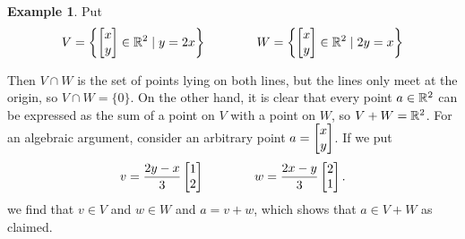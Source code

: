 \documentclass[reqno]{amsart}
\theoremstyle{definition}
\newtheorem{example}[theorem]{Example}
\begin{document}
\begin{example}\label{eg-sum-meet-i}
 Put
 \[ V = \left\{\left[\begin{matrix} x\\ y\end{matrix}\right]\in{\mathbb{R}}^2\;|\; y=2x\right\} \hspace{4em}
    W = \left\{\left[\begin{matrix} x\\ y\end{matrix}\right]\in{\mathbb{R}}^2\;|\; 2y=x\right\}
 \]

 \bigskip

 \begin{center}
 \end{center}
 Then $V\cap W$ is the set of points lying on both lines, but the
 lines only meet at the origin, so $V\cap W=\{0\}$.  On the other hand,
 it is clear that every point $a\in{\mathbb{R}}^2$ can be expressed as the sum
 of a point on $V$ with a point on $W$, so $V+W={\mathbb{R}}^2$.  For an
 algebraic argument, consider an arbitrary point $a=\left[\begin{matrix} x\\y \end{matrix}\right]$.
 If we put
 \[ v = \frac{2y-x}{3}\left[\begin{matrix} 1\\ 2\end{matrix}\right] \hspace{4em}
    w = \frac{2x-y}{3}\left[\begin{matrix} 2\\ 1\end{matrix}\right].
 \]
 we find that $v\in V$ and $w\in W$ and $a=v+w$, which shows that
 $a\in V+W$ as claimed.
\end{example}
\end{document}
